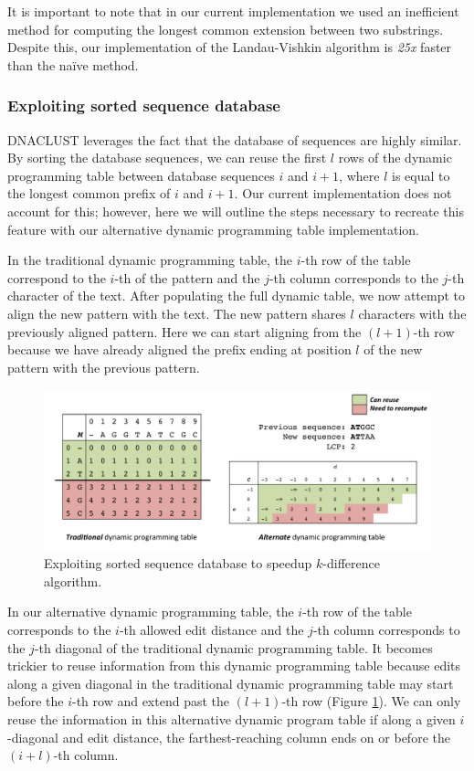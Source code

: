 It is important to note that in our current implementation we used an inefficient method for computing the longest common extension between two substrings.
Despite this, our implementation of the Landau-Vishkin algorithm is \emph{25x} faster than the na\"ive method.

\subsubsection{Exploiting sorted sequence database}
DNACLUST leverages the fact that the database of sequences are highly similar.
By sorting the database sequences, we can reuse the first $l$ rows of the dynamic programming table between database sequences $i$ and $i+1$, where $l$ is equal to the longest common prefix of $i$ and $i+1$.
Our current implementation does not account for this; however, here we will outline the steps necessary to recreate this feature with our alternative dynamic programming table implementation.

In the traditional dynamic programming table, the $i$-th row of the table correspond to the $i$-th of the pattern and the $j$-th column corresponds to the $j$-th character of the text.
After populating the full dynamic table, we now attempt to align the new pattern with the text.
The new pattern shares $l$ characters with the previously aligned pattern.
Here we can start aligning from the $(l+1)$-th row because we have already aligned the prefix ending at position $l$ of the new pattern with the previous pattern.


\begin{figure}[tb]
  \centering
    \includegraphics[width=1.0\textwidth]{work_saving}
  \caption{Exploiting sorted sequence database to speedup $k$-difference algorithm.}
  \label{fig:work_saving}
\end{figure}


In our alternative dynamic programming table, the $i$-th row of the table corresponds to the $i$-th allowed edit distance and the $j$-th column corresponds to the $j$-th diagonal of the traditional dynamic programming table.
It becomes trickier to reuse information from this dynamic programming table because edits along a given diagonal in the traditional dynamic programming table may start before the $i$-th row and extend past the $(l+1)$-th row (Figure \ref{fig:work_saving}).
We can only reuse the information in this alternative dynamic program table if along a given $i$-diagonal and edit distance, the farthest-reaching column ends on or before the $(i+l)$-th column.

